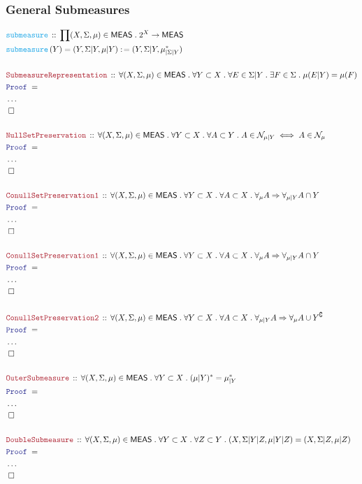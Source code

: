 \documentclass[12pt]{scrartcl}
\newcommand{\FUNC}[1]{\textcolor{Cerulean}{\mathtt{#1}}}
\newcommand{\LOGIC}[1]{\textcolor{Blue}{\mathtt{#1}}}
\newcommand{\THM}[1]{\textcolor{Maroon}{\mathtt{#1}}}
\renewcommand{\.}{\; . \;}
\newcommand{\de}{: \kern 0.1pc =}
\newcommand{\Act}[1]{\left( #1 \right)}
\newcommand{\Theorem}[2]{& \THM{#1} \, :: \, #2 \\ & \Proof = \\ }
\newcommand{\DeclareFunc}[2]{& \FUNC{#1} \, :: \, #2 \\}
\newcommand{\DefineNamedFunc}[4]{&  \FUNC{#1}\Act{#2} = #3 \de #4 \\}
\newcommand{\Page}[1]{ \begin{align*} #1 \end{align*}   }
\newcommand{\NoProof}{ & \ldots \\ \EndProof}
\newcommand{\Imply}{\Rightarrow}
\renewcommand{\c}{\complement}
\newcommand{\QED}{\; \square}
\newcommand{\EndProof}{& \QED \\}
\newcommand{\Proof}{\LOGIC{Proof} \; }
\newcommand{\Null}{\mathcal{N}}
\newcommand{\MEAS}{\mathsf{MEAS}}
\begin{document}
\subsubsection{General Submeasures}
\Page{
	\DeclareFunc{submeasure}
	{
		\prod (X,\Sigma,\mu) \in \MEAS \.2^X \to \MEAS	
	}
	\DefineNamedFunc{submeasure}{Y}{(Y,\Sigma|Y,\mu|Y)}{(Y,\Sigma|Y,\mu^*_{|\Sigma|Y})}
	\\
	\Theorem{SubmeasureRepresentation}
	{
		\forall (X,\Sigma,\mu) \in \MEAS \.
		\forall Y \subset X \.
		\forall E \in \Sigma|Y \. 
		\exists F \in \Sigma \.
		\mu(E|Y) = \mu(F) 
	}
	\NoProof
	\\
	\Theorem{NullSetPreservation}
	{
		\forall (X,\Sigma,\mu) \in \MEAS \.
		\forall Y \subset X \.
		\forall A \subset Y \.
		A \in \Null_{\mu|Y} \iff A \in \Null_{\mu}
	}
	\NoProof
	\\
	\Theorem{ConullSetPreservation1}
	{
		\forall (X,\Sigma,\mu) \in \MEAS \.
		\forall Y \subset X \.
		\forall A \subset X \.
		\forall_{\mu} A  \Imply 
		\forall_{\mu|Y} A \cap Y
	}
	\NoProof
	\\
	\Theorem{ConullSetPreservation1}
	{
		\forall (X,\Sigma,\mu) \in \MEAS \.
		\forall Y \subset X \.
		\forall A \subset X \.
		\forall_{\mu} A  \Imply 
		\forall_{\mu|Y} A \cap Y
	}
	\NoProof
	\\
	\Theorem{ConullSetPreservation2}
	{
		\forall (X,\Sigma,\mu) \in \MEAS \.
		\forall Y \subset X \.
		\forall A \subset X \.
		\forall_{\mu|Y} A  \Imply 
		\forall_{\mu} A \cup Y^\c
	}
	\NoProof
	\\
	\Theorem{OuterSubmeasure}
	{
		\forall (X,\Sigma,\mu) \in \MEAS \.
		\forall Y \subset X \. 
		(\mu|Y)^* = \mu^*_{|Y}
	}
	\NoProof
	\\
	\Theorem{DoubleSubmeasure}
	{
		\forall (X,\Sigma,\mu) \in \MEAS \.
		\forall Y \subset X \. 
		\forall Z \subset Y \.
		(X,\Sigma|Y|Z,\mu|Y|Z)  = (X,\Sigma|Z,\mu|Z)
	}
	\NoProof
}
\newpage
\end{document}
